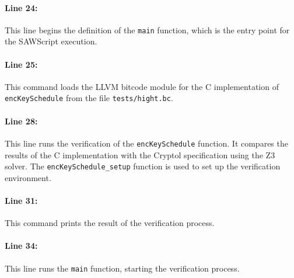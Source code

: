 \documentclass{article}
\begin{document}
    \paragraph{Line 24:} 
    This line begins the definition of the \texttt{main} function, which is the entry point for the SAWScript execution.
    
    \paragraph{Line 25:} 
    This command loads the LLVM bitcode module for the C implementation of \texttt{encKeySchedule} from the file \texttt{tests/hight.bc}.
    
    \paragraph{Line 28:} 
    This line runs the verification of the \texttt{encKeySchedule} function. It compares the results of the C implementation with the Cryptol specification using the Z3 solver. The \texttt{encKeySchedule\_setup} function is used to set up the verification environment.
    
    \paragraph{Line 31:} 
    This command prints the result of the verification process.
    
    \paragraph{Line 34:} 
    This line runs the \texttt{main} function, starting the verification process.
    
    
\end{document}
